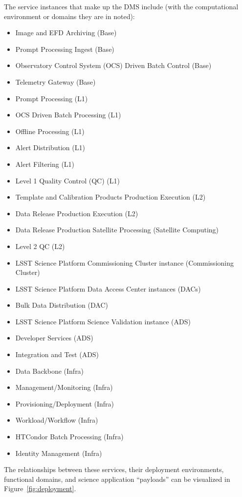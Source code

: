 \documentclass[DM,lsstdraft,toc]{lsstdoc}
\begin{document}
The service instances that make up the DMS include (with the
computational environment or domains they are in noted):
\begin{itemize}
\item
  Image and EFD Archiving (Base)
\item
  Prompt Processing Ingest (Base)
\item
  Observatory Control System (OCS) Driven Batch Control (Base)
\item
  Telemetry Gateway (Base)
\item
  Prompt Processing (L1)
\item
  OCS Driven Batch Processing (L1)
\item
  Offline Processing (L1)
\item
  Alert Distribution (L1)
\item
  Alert Filtering (L1)
\item
  Level 1 Quality Control (QC) (L1)
\item
  Template and Calibration Products Production Execution (L2)
\item
  Data Release Production Execution (L2)
\item
  Data Release Production Satellite Processing (Satellite Computing)
\item
  Level 2 QC (L2)
\item
  LSST Science Platform Commissioning Cluster instance (Commissioning
  Cluster)
\item
  LSST Science Platform Data Access Center instances (DACs)
\item
  Bulk Data Distribution (DAC)
\item
  LSST Science Platform Science Validation instance (ADS)
\item
  Developer Services (ADS)
\item
  Integration and Test (ADS)
\item
  Data Backbone (Infra)
\item
  Management/Monitoring (Infra)
\item
  Provisioning/Deployment (Infra)
\item
  Workload/Workflow (Infra)
\item
  HTCondor Batch Processing (Infra)
\item
  Identity Management (Infra)
\end{itemize}

The relationships between these services, their deployment environments,
functional domains, and science application ``payloads'' can be
visualized in Figure~\ref{fig:deployment}.
\end{document}
